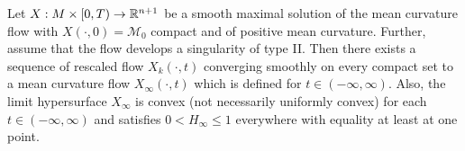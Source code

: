     \begin{thm}
        Let $ X: M \times [0, T) \to \mathbb{R}^{n+1}$ be a smooth maximal solution of the mean curvature flow with $ X(\cdot,0) = \mathcal{M}_{0} $ compact and of positive mean curvature. Further, assume that the flow develops a singularity of type II. Then there exists a sequence of rescaled flow $ X_{k}(\cdot,t) $ converging smoothly on every compact set to a mean curvature flow $ X_{\infty}(\cdot, t) $ which is defined for $ t \in (-\infty, \infty) $. Also, the limit hypersurface $ X_{\infty} $ is convex (not necessarily uniformly convex) for each $ t \in (-\infty, \infty)  $ and satisfies $ 0< H_{\infty}\le 1 $ everywhere with equality at least at one point. 
    \end{thm}